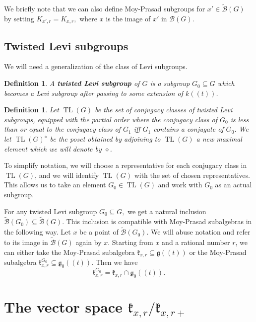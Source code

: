 \documentclass[12pt]{article}
\DeclareMathOperator{\TL}{TL}
\newtheorem{definition}[theorem]{Definition}
\theoremstyle{remark}
\begin{document}
We briefly note that we can also define Moy-Prasad subgroups for $x'\in\widetilde{\mathcal{B}}(G)$ by setting $K_{x',r}=K_{x,r},$ where $x$ is the image of $x'$ in $\mathcal{B}(G).$

\subsection{Twisted Levi subgroups}

We will need a generalization of the class of Levi subgroups.

\begin{definition}
A \textbf{twisted Levi subgroup} of $G$ is a subgroup $G_0\subseteq G$ which becomes a Levi subgroup after passing to some extension of $k((t))$.
\end{definition}

\begin{definition}
Let $\TL(G)$ be the set of conjugacy classes of twisted Levi subgroups, equipped with the partial order where the conjugacy class of $G_0$ is less than or equal to the conjugacy class of $G_1$ iff $G_1$ contains a conjugate of $G_0$. We let $\TL(G)^\diamond$ be the poset obtained by adjoining to $\TL(G)$ a new maximal element which we will denote by $\diamond$. 
\end{definition}

To simplify notation, we will choose a representative for each conjugacy class in $\TL(G)$, and we will identify $\TL(G)$ with the set of chosen representatives. This allows us to take an element $G_0\in\TL(G)$ and work with $G_0$ as an actual subgroup. 

For any twisted Levi subgroup $G_0\subseteq G,$ we get a natural inclusion $\widetilde{\mathcal{B}}(G_0)\subseteq\widetilde{\mathcal{B}}(G)$. This inclusion is compatible with Moy-Prasad subalgebras in the following way. Let $x$ be a point of $\widetilde{\mathcal{B}}(G_0)$. We will abuse notation and refer to its image in $\widetilde{\mathcal{B}}(G)$ again by $x$. Starting from $x$ and a rational number $r$, we can either take the Moy-Prasad subalgebra $\mathfrak{k}_{x,r}\subseteq\mathfrak{g}((t))$ or the Moy-Prasad subalgebra $\mathfrak{k}_{x,r}^{G_0}\subseteq\mathfrak{g}_0((t)).$ Then we have
\[
\mathfrak{k}_{x,r}^{G_0}=\mathfrak{k}_{x,r}\cap\mathfrak{g}_0((t)).
\]

\section{The vector space $\mathfrak{k}_{x,r}/\mathfrak{k}_{x,r+}$}\label{s:stratification}
\end{document}
